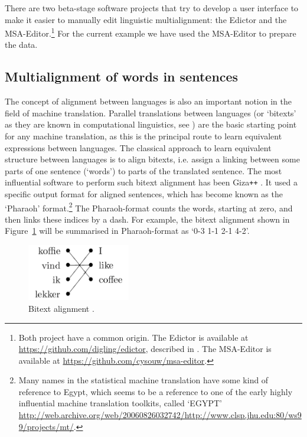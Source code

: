 \documentclass[11pt]{article}
\begin{document}
There are two beta-stage software projects that try to develop a user interface to make it easier to manually edit linguistic multialignment: the Edictor and the MSA-Editor.\footnote{Both project have a common origin. The Edictor is available at \url{https://github.com/digling/edictor}, described in \textcite{list2017}. The MSA-Editor is available at \url{https://github.com/cysouw/msa-editor}.} For the current example we have used the MSA-Editor to prepare the data.

\subsection{Multialignment of words in sentences}

The concept of alignment between languages is also an important notion in the field of machine translation. Parallel translations between languages (or `bitexts' as they are known in computational linguistics, see \cite{tiedemann2011}) are the basic starting point for any machine translation, as this is the principal route to learn equivalent expressions between languages. The classical approach to learn equivalent structure between languages is to align bitexts, i.e. assign a linking between some parts of one sentence (`words') to parts of the translated sentence. The most influential software to perform such bitext alignment has been Giza\texttt{++} \parencite{och2003}. It used a specific output format for aligned sentences, which has become known as the `Pharaoh' format.\footnote{Many names in the statistical machine translation have some kind of reference to Egypt, which seems to be a reference to one of the early highly influential machine translation toolkits, called `EGYPT' \url{http://web.archive.org/web/20060826032742/http://www.clsp.jhu.edu:80/ws99/projects/mt/}.} The Pharaoh-format counts the words, starting at zero, and then links these indices by a dash. For example, the bitext alignment shown in Figure~\ref{fig:bitext_tiedemann} will be summarised in Pharaoh-format as `0-3 1-1 2-1 4-2'.

\begin{figure}[htbp]
  \centering
  \includegraphics[width=0.4\textwidth]{images/bitext_tiedemann.png}
  \caption{Bitext alignment \parencite[4]{tiedemann2011}.}
  \label{fig:bitext_tiedemann}
\end{figure}
\end{document}
